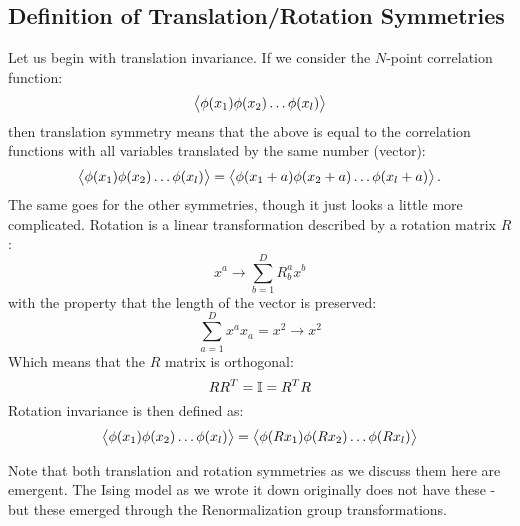 \subsection{Definition of Translation/Rotation Symmetries}
Let us begin with translation invariance. If we consider the $N$-point correlation function:
\begin{equation}
    \avg{\phi(x_1)\phi(x_2) \ldots \phi(x_l)}
\end{equation}
then translation symmetry means that the above is equal to the correlation functions with all variables translated by the same number (vector):
\begin{equation}
    \avg{\phi(x_1)\phi(x_2) \ldots \phi(x_l)} = \avg{\phi(x_1 + a)\phi(x_2 + a) \ldots \phi(x_l + a)}.
\end{equation}
The same goes for the other symmetries, though it just looks a little more complicated. Rotation is a linear transformation described by a rotation matrix $R$:
\begin{equation}
    x^a \to \sum_{b=1}^D R^a_b x^b 
\end{equation}
with the property that the length of the vector is preserved:
\begin{equation}
    \sum_{a=1}^D x^ax_a = x^2 \to x^2
\end{equation}
Which means that the $R$ matrix is orthogonal:
\begin{equation}
    RR^T = \mathbb{I} = R^T R
\end{equation}
Rotation invariance is then defined as:
\begin{equation}
    \avg{\phi(x_1)\phi(x_2)\ldots \phi(x_l)} = \avg{\phi(Rx_1)\phi(Rx_2)\ldots \phi(Rx_l)}
\end{equation}

Note that both translation and rotation symmetries as we discuss them here are emergent. The Ising model as we wrote it down originally does not have these - but these emerged through the Renormalization group transformations.

